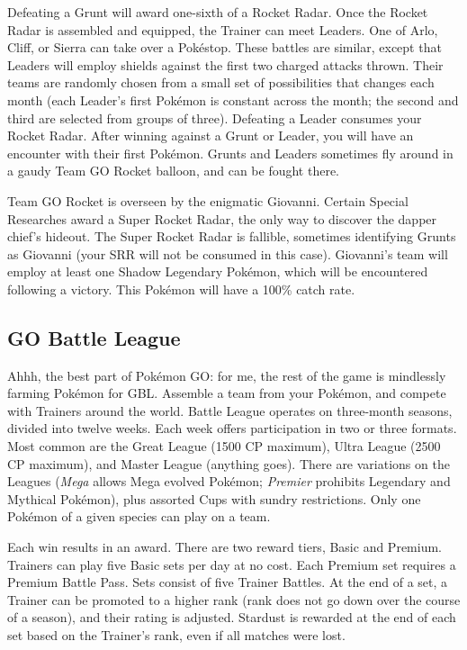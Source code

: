 Defeating a Grunt will award one-sixth of a Rocket Radar.
Once the Rocket Radar is assembled and equipped, the Trainer can meet Leaders.
One of Arlo, Cliff, or Sierra can take over a Pokéstop.
These battles are similar, except that Leaders will employ shields against the first two charged attacks thrown.
Their teams are randomly chosen from a small set of possibilities that changes each month
  (each Leader's first Pokémon is constant across the month; the second and third are selected
  from groups of three).
Defeating a Leader consumes your Rocket Radar.
After winning against a Grunt or Leader, you will have an encounter with their first Pokémon.
Grunts and Leaders sometimes fly around in a gaudy Team GO Rocket balloon,
  and can be fought there.

Team GO Rocket is overseen by the enigmatic Giovanni.
Certain Special Researches award a Super Rocket Radar, the only way to discover
 the dapper chief's hideout.
The Super Rocket Radar is fallible, sometimes identifying Grunts as Giovanni
 (your SRR will not be consumed in this case).
Giovanni's team will employ at least one Shadow Legendary Pokémon, which
 will be encountered following a victory.
This Pokémon will have a 100\% catch rate.

\subsection{GO Battle League\label{subsec:league}}
Ahhh, the best part of Pokémon GO: for me, the rest of the game is mindlessly farming Pokémon for GBL.
Assemble a team from your Pokémon, and compete with Trainers around the world.
Battle League operates on three-month seasons, divided into twelve weeks.
Each week offers participation in two or three formats.
Most common are the Great League (1500 CP maximum), Ultra League (2500 CP maximum),
 and Master League (anything goes).
There are variations on the Leagues (\textit{Mega} allows Mega evolved Pokémon;
 \textit{Premier} prohibits Legendary and Mythical Pokémon),
 plus assorted Cups with sundry restrictions.
Only one Pokémon of a given species can play on a team.

Each win results in an award.
There are two reward tiers, Basic and Premium.
Trainers can play five Basic sets per day at no cost.
Each Premium set requires a Premium Battle Pass.
Sets consist of five Trainer Battles.
At the end of a set, a Trainer can be promoted to a higher rank (rank does not
 go down over the course of a season), and their rating is adjusted.
Stardust is rewarded at the end of each set based on the Trainer's rank,
 even if all matches were lost.

